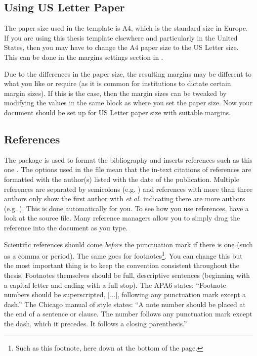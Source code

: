 \subsection{Using US Letter Paper}

The paper size used in the template is A4, which is the standard size in Europe.
If you are using this thesis template elsewhere and particularly in the United States, then you may have to change the A4 paper size to the US Letter size.
This can be done in the margins settings section in .

Due to the differences in the paper size, the resulting margins may be different to what you like or require (as it is common for institutions to dictate certain margin sizes).
If this is the case, then the margin sizes can be tweaked by modifying the values in the same block as where you set the paper size.
Now your document should be set up for US Letter paper size with suitable margins.

\subsection{References}

The  package is used to format the bibliography and inserts references such as this one \parencite{Reference1}.
The options used in the  file mean that the in-text citations of references are formatted with the author(s) listed with the date of the publication.
Multiple references are separated by semicolons (e.g. \cite{Reference2, Reference1}) and references with more than three authors only show the first author with \emph{et al.} indicating there are more authors (e.g. \cite{Reference3}). This is done automatically for you.
To see how you use references, have a look at the  source file.
Many reference managers allow you to simply drag the reference into the document as you type.

Scientific references should come \emph{before} the punctuation mark if there is one (such as a comma or period).
The same goes for footnotes\footnote{Such as this footnote, here down at the bottom of the page.}.
You can change this but the most important thing is to keep the convention consistent throughout the thesis.
Footnotes themselves should be full, descriptive sentences (beginning with a capital letter and ending with a full stop).
The APA6 states: \enquote{Footnote numbers should be superscripted, [...], following any punctuation mark except a dash.}
The Chicago manual of style states: \enquote{A note number should be placed at the end of a sentence or clause.
The number follows any punctuation mark except the dash, which it precedes.
It follows a closing parenthesis.}

